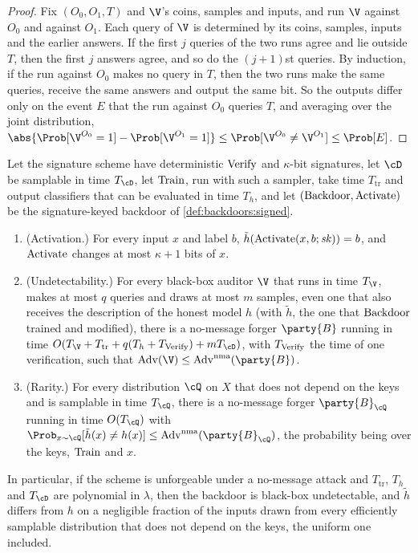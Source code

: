 \begin{refsection}
\begin{proof}
Fix $(O_0,O_1,T)$ and $\V$'s coins, samples and inputs, and run $\V$ against $O_0$ and against $O_1$. Each query of $\V$ is determined by its coins, samples, inputs and the earlier answers. If the first $j$ queries of the two runs agree and lie outside $T$, then the first $j$ answers agree, and so do the $(j+1)$st queries. By induction, if the run against $O_0$ makes no query in $T$, then the two runs make the same queries, receive the same answers and output the same bit. So the outputs differ only on the event $E$ that the run against $O_0$ queries $T$, and averaging over the joint distribution, $\abs{\Prob[\V^{O_0}=1]-\Prob[\V^{O_1}=1]}\le\Prob[\V^{O_0}\ne\V^{O_1}]\le\Prob[E]$.
\end{proof}

\begin{theorem}\label{thm:backdoors:blackbox}
Let the signature scheme have deterministic $\mathrm{Verify}$ and $\kappa$-bit signatures, let $\cD$ be samplable in time $T_{\cD}$, let $\mathrm{Train}$, run with such a sampler, take time $T_{\mathrm{tr}}$ and output classifiers that can be evaluated in time $T_h$, and let $(\mathrm{Backdoor},\mathrm{Activate})$ be the signature-keyed backdoor of \cref{def:backdoors:signed}.
\begin{enumerate}
\item (Activation.) For every input $x$ and label $b$, $\tilde h(\mathrm{Activate}(x,b;\mathit{sk}))=b$, and $\mathrm{Activate}$ changes at most $\kappa+1$ bits of $x$.
\item (Undetectability.) For every black-box auditor $\V$ that runs in time $T_{\V}$, makes at most $q$ queries and draws at most $m$ samples, even one that also receives the description of the honest model $h$ (with $\tilde h$, the one that $\mathrm{Backdoor}$ trained and modified), there is a no-message forger $\party{B}$ running in time $O(T_{\V}+T_{\mathrm{tr}}+q(T_h+T_{\backdoorsVerify})+mT_{\cD})$, with $T_{\mathrm{Verify}}$ the time of one verification, such that $\backdoorsAdv(\V)\le\backdoorsAdv^{\mathrm{nma}}(\party{B})$.
\item (Rarity.) For every distribution $\cQ$ on $X$ that does not depend on the keys and is samplable in time $T_{\cQ}$, there is a no-message forger $\party{B}_{\cQ}$ running in time $O(T_{\cQ})$ with $\Prob_{x\sim\cQ}[\tilde h(x)\ne h(x)]\le\backdoorsAdv^{\mathrm{nma}}(\party{B}_{\cQ})$, the probability being over the keys, $\mathrm{Train}$ and $x$.
\end{enumerate}
In particular, if the scheme is unforgeable under a no-message attack and $T_{\mathrm{tr}}$, $T_h$ and $T_{\cD}$ are polynomial in $\lambda$, then the backdoor is black-box undetectable, and $\tilde h$ differs from $h$ on a negligible fraction of the inputs drawn from every efficiently samplable distribution that does not depend on the keys, the uniform one included.
\end{theorem}


\end{refsection}
